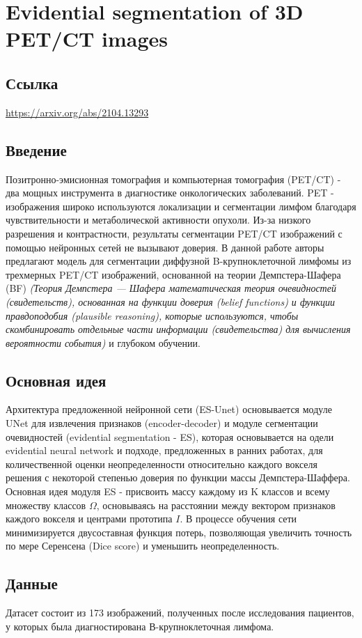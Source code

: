 \section{Evidential segmentation of 3D PET/CT images}

\subsection*{Ссылка} \url{https://arxiv.org/abs/2104.13293} 
\subsection*{Введение}
Позитронно-эмисионная томография и компьютерная томография (PET/CT) - 
два мощных инструмента в диагностике онкологических заболеваний. PET - 
изображения широко используются локализации и сегментации лимфом благодаря 
чувствительности и метаболической активности опухоли. Из-за низкого разрешения и контрастности, 
результаты сегментации PET/CT изображений с помощью нейронных сетей не вызывают доверия. 
В данной работе авторы предлагают модель для сегментации диффузной B-крупноклеточной лимфомы из 
трехмерных PET/CT изображений, основанной на теории Демпстера-Шафера (BF) 
\textit{(Теория Демпстера — Шафера математическая теория очевидностей (свидетельств), 
основанная на функции доверия (belief functions) и функции правдоподобия (plausible reasoning), 
которые используются, чтобы скомбинировать отдельные части информации (свидетельства) для вычисления вероятности события)} и глубоком обучении. 
\subsection*{Основная идея}
Архитектура предложенной нейронной сети (ES-Unet) основывается модуле UNet 
для извлечения признаков (encoder-decoder) и модуле сегментации очевидностей 
(evidential segmentation - ES), которая основывается на одели evidential 
neural network и подходе, предложенных в ранних работах, для количественной 
оценки неопределенности относительно каждого вокселя решения с некоторой степенью 
доверия по функции массы Демпстера-Шаффера. Основная идея модуля ES - присвоить массу 
каждому из K классов и всему множеству классов \(\Omega\), основываясь на расстоянии между 
вектором признаков каждого вокселя и центрами прототипа \(I\). В процессе обучения сети 
минимизируется двусоставная функция потерь, позволяющая увеличить точность по мере Серенсена (Dice score) и уменьшить неопределенность.
\subsection*{Данные}
Датасет состоит из 173 изображений, полученных после исследования пациентов, у которых была диагностирована В-крупноклеточная лимфома.
